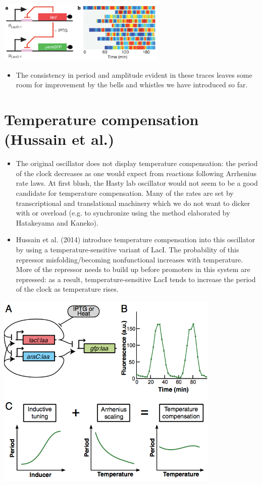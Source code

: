 \documentclass{article}
\begin{document}
\begin{center}
\includegraphics[width=0.6\textwidth]{stricker_negreg.png}
\end{center}
\begin{itemize}
\item The consistency in period and amplitude evident in these traces leaves some room for improvement by the bells and whistles we have introduced so far. 
\end{itemize}

\section*{Temperature compensation (Hussain et al.)}
\begin{itemize}
\item  The original oscillator does not display temperature compensation: the period of the clock decreases as one would expect from reactions following Arrhenius rate laws.  At first blush, the Hasty lab oscillator would not seem to be a good candidate for temperature compensation. Many of the rates are set by transcriptional and translational machinery which we do not want to dicker with or overload (e.g. to synchronize using the method elaborated by Hatakeyama and Kaneko).
\item Hussain et al. (2014) introduce temperature compensation into this oscillator by using a temperature-sensitive variant of LacI. The probability of this repressor misfolding/becoming nonfunctional increases with temperature. More of the repressor needs to build up before promoters in this system are repressed: as a result, temperature-sensitive LacI tends to increase the period of the clock as temperature rises.
\end{itemize}
\begin{center}
\includegraphics[width=0.8\textwidth]{stricker_tempcomp.png}
\end{center}
\end{document}
